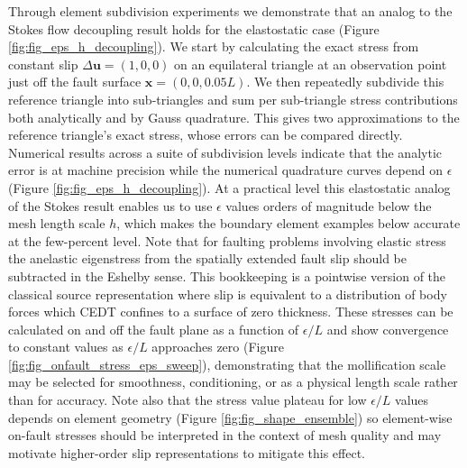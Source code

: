 \documentclass[12pt]{article}
\newcommand{\eps}{\epsilon}
\newcommand{\obs}{\mathbf{x}}
\newcommand{\Du}{\Delta\mathbf{u}}
\begin{document}
Through element subdivision experiments we demonstrate that an analog to the Stokes flow decoupling result holds for the elastostatic case (Figure \ref{fig:fig_eps_h_decoupling}).  We start by calculating the exact stress from constant slip $\Du=(1, 0, 0)$ on an equilateral triangle at an observation point just off the fault surface $\obs=(0, 0, 0.05L)$.  We then repeatedly subdivide this reference triangle into sub-triangles and sum per sub-triangle stress contributions both analytically and by Gauss quadrature.  This gives two approximations to the reference triangle's exact stress, whose errors can be compared directly.  Numerical results across a suite of subdivision levels indicate that the analytic error is at machine precision while the numerical quadrature curves depend on $\eps$ (Figure \ref{fig:fig_eps_h_decoupling}).  At a practical level this elastostatic analog of the Stokes result \citep{FerrantiCortez2024} enables us to use $\eps$ values orders of magnitude below the mesh length scale $h$, which makes the boundary element examples below accurate at the few-percent level. Note that for faulting problems involving elastic stress the anelastic eigenstress from the spatially extended fault slip should be subtracted in the Eshelby \citep{Eshelby1957} sense.  This bookkeeping is a pointwise version of the classical source representation where slip is equivalent to a distribution of body forces which CEDT confines to a surface of zero thickness.  These stresses can be calculated on and off the fault plane as a function of   $\eps/L$ and show convergence to constant values as $\eps/L$ approaches zero (Figure \ref{fig:fig_onfault_stress_eps_sweep}), demonstrating that the mollification scale may be selected for smoothness, conditioning, or as a physical length scale rather than for accuracy.  Note also that the stress value plateau for low $\eps/L$ values depends on element geometry (Figure \ref{fig:fig_shape_ensemble}) so element-wise on-fault stresses should be interpreted in the context of mesh quality and may motivate higher-order slip representations to mitigate this effect.
\end{document}
